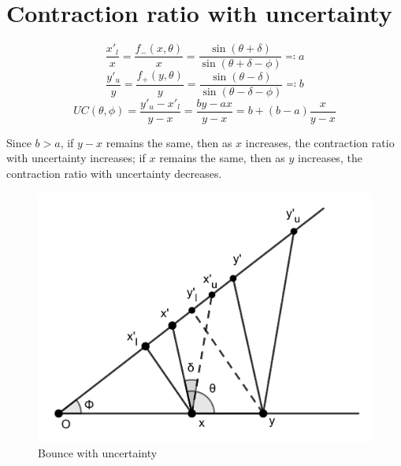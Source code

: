 \documentclass[11pt]{article}%
\begin{document}
\section{Contraction ratio with uncertainty}
\[\frac{x'_{l}}{x} = \frac{f_{-}(x, \theta)}{x} = \frac{\sin(\theta + \delta)}{\sin(\theta + \delta - \phi)} \eqqcolon a\]
\[\frac{y'_{u}}{y} = \frac{f_{+}(y, \theta)}{y} = \frac{\sin(\theta - \delta)}{\sin(\theta - \delta - \phi)} \eqqcolon b\]
\[UC(\theta, \phi) = \frac{y'_u- x'_l}{y-x} = \frac{by-ax}{y-x} = b+(b-a)\frac{x}{y-x}\]

Since $b > a$, if $y-x$ remains the same, then as $x$ increases, the contraction ratio with uncertainty increases; if $x$ remains the same, then as $y$ increases, the contraction ratio with uncertainty decreases.

\begin{figure}[!h]
  \centering
  \includegraphics[width=0.7\linewidth]{uncertainty_bounce.png}
  \caption{Bounce with uncertainty}
  \label{fig:uncertain_bounce}
\end{figure}
\end{document}
